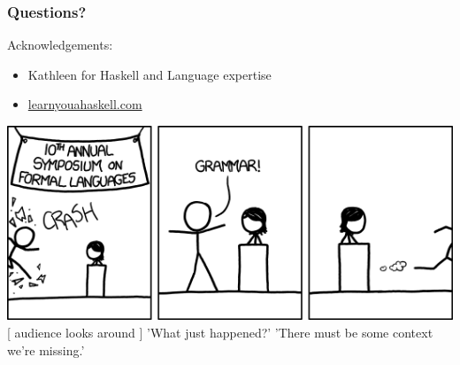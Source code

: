 
\begin{frame} \frametitle{Questions?}
Acknowledgements:
\begin{itemize}
\item Kathleen for Haskell and Language expertise
\item \href{http://learnyouahaskell.com/}{learnyouahaskell.com}
\end{itemize}
\begin{center}
  \includegraphics[width=.75\columnwidth]{formal_languages.png} \\
  {\tiny {[} audience looks around {]} 'What just happened?'
         'There must be some context we're missing.'}
\end{center}
\end{frame}

